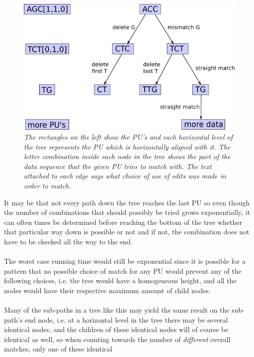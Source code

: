 \documentclass[12pt]{article}
\newcommand{\pu}{PU }
\newcommand{\pus}{PU's }
\begin{document}
\begin{figure}[H]
\begin{center}
\includegraphics[scale=0.65]{Diagrams/tree.png}
\end{center}
\caption{\textit{The rectangles on the left show the \pus and each horizontal level of the tree represents the \pu 
which is horizontally aligned with it. The letter combination inside each node in the tree shows the part of the data sequence
that the given \pu tries to match with. The text attached to each edge says what choice of use of edits was made 
in order to match.}}
\end{figure}
\noindent It may be that not every path down the tree reaches the last \pu so even though the number of combinations that 
should possibly be tried grows exponentially, it can often times be determined before
reaching the bottom of the tree whether that particular way down is possible or not and if not, the combination does
not have to be checked all the way to the end. \\ \\
The worst case running time would still be exponential since it is possible for a pattern that no possible choice of match
for any \pu would prevent any of the following choices, i.e. the tree would have a homogeneous height, and
all the nodes would have their respective maximum amount of child nodes. \\ \\
Many of the sub-paths in a tree like this may yield the same result on the sub-path's end node, i.e. at a horizontal
level in the tree there may be several identical nodes, and the children of these identical nodes will of course be
identical as well, so when counting towards the number of \emph{different} overall matches, only one of these identical
\end{document}
